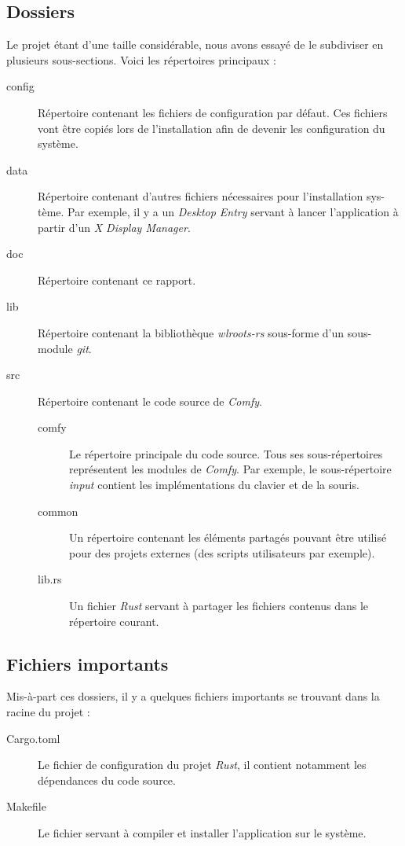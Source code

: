 \documentclass[titlepage]{article}
\begin{document}
\subsection{Dossiers}
Le projet étant d'une taille considérable, nous avons essayé de le subdiviser en
plusieurs sous-sections. Voici les répertoires principaux :
\begin{description}
	\item [config]
		Répertoire contenant les fichiers de configuration par défaut. Ces fichiers
		vont être copiés lors de l'installation afin de devenir les configuration du
		système.
	\item [data]
		Répertoire contenant d'autres fichiers nécessaires pour l'installation
		sys-tème. Par exemple, il y a un \textit{Desktop Entry} servant à lancer
		l'application à partir d'un \textit{X Display Manager}.
	\item [doc]
		Répertoire contenant ce rapport.
	\item [lib]
		Répertoire contenant la bibliothèque \textit{wlroots-rs} sous-forme d'un
		sous-module \textit{git}.
	\item [src]
		Répertoire contenant le code source de \textit{Comfy}.
		\begin{description}
			\item [comfy]
				Le répertoire principale du code source. Tous ses sous-répertoires
				représentent les modules de \textit{Comfy}. Par exemple, le sous-répertoire
				\textit{input} contient les implémentations du clavier et de la souris.
			\item [common]
				Un répertoire contenant les éléments partagés pouvant être utilisé pour des
				projets externes (des scripts utilisateurs par exemple).
			\item [lib.rs]
				Un fichier \textit{Rust} servant à partager les fichiers contenus dans
				le répertoire courant.
		\end{description}
\end{description}

\subsection{Fichiers importants}
Mis-à-part ces dossiers, il y a quelques fichiers importants se trouvant dans la
racine du projet :
\begin{description}
	\item [Cargo.toml]
		Le fichier de configuration du projet \textit{Rust}, il contient notamment
		les dépendances du code source.
	\item [Makefile]
		Le fichier servant à compiler et installer l'application sur le système.
\end{description}
\end{document}

